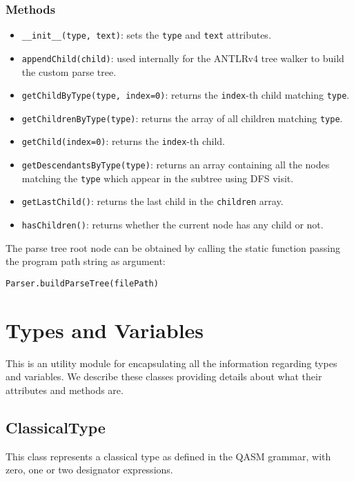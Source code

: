 \documentclass[12pt,a4paper]{report}
\theoremstyle{definition}
\theoremstyle{definition}
\theoremstyle{definition}
\begin{document}
\subsubsection{Methods}
\begin{itemize}
    \itemsep 0em
    \item \texttt{\_\_init\_\_(type, text)}: sets the \texttt{type} and \texttt{text} attributes.
    \item \texttt{appendChild(child)}: used internally for the ANTLRv4 tree walker to build the custom parse tree.
    \item \texttt{getChildByType(type, index=0)}: returns the \texttt{index}-th child matching \texttt{type}.
    \item \texttt{getChildrenByType(type)}: returns the array of all children matching \texttt{type}.
    \item \texttt{getChild(index=0)}: returns the \texttt{index}-th child.
    \item \texttt{getDescendantsByType(type)}: returns an array containing all the nodes matching the \texttt{type} which appear in the subtree using DFS visit.
    \item \texttt{getLastChild()}: returns the last child in the \texttt{children} array.
    \item \texttt{hasChildren()}: returns whether the current node has any child or not.
\end{itemize}
The parse tree root node can be obtained by calling the static function passing the program path string as argument:
\begin{lstlisting}
Parser.buildParseTree(filePath)
\end{lstlisting}


\section{Types and Variables}
This is an utility module for encapsulating all the information regarding types and variables.
We describe these classes providing details about what their attributes and methods are.

\subsection{ClassicalType}
This class represents a classical type as defined in the QASM grammar, with zero, one or two designator expressions.
\end{document}
